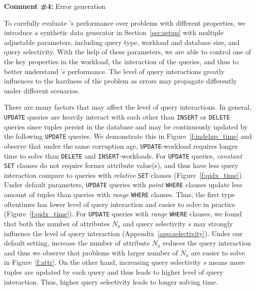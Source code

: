 \comskip

\noindent
\textbf{Comment \#4:} Error generation
\begin{quote}
\end{quote}


To carefully evaluate \sys's performance over problems with different
properties, we introduce a synthetic data generator in Section~\ref{sec:setup}
with multiple adjustable parameters, including query type, workload and
database size, and query selectivity. With the help of these parameters, we
are able to control one of the key properties in the workload, the interaction
of the queries, and thus to better understand \sys's performance. The level of
query interactions greatly influences to the hardness of the problem as errors
may propagate differently under different scenarios.

There are many factors that may affect the level of query interactions. In
general, \texttt{UPDATE} queries are heavily interact with each other than
\texttt{INSERT} or \texttt{DELETE} queries since tuples persist in the
database and may be continuously updated by the following \texttt{UPDATE}
queries. We demonstrate this in Figure~\ref{f:indelup_time} and observe that
under the same corruption age, \texttt{UPDATE}-workload requires longer time
to solve than \texttt{DELETE} and \texttt{INSERT}-workloads. For
\texttt{UPDATE} queries, \textit{constant} \texttt{SET} clauses do not require
former attribute value(s), and thus have less query interaction compare to
queries with \textit{relative} \texttt{SET} clauses
(Figure~\ref{f:qidx_time}). Under default parameters, \texttt{UPDATE} queries
with \textit{point} \texttt{WHERE} clauses update less amount of tuples than
queries with \textit{range} \texttt{WHERE} clauses. Thus, the first type
oftentimes has lower level of query interaction and easier to solve in
practice (Figure~\ref{f:qidx_time}). For \texttt{UPDATE} queries with
\textit{range} \texttt{WHERE} clauses, we found that both the number of
attributes $N_a$ and query selectivity $s$ may strongly influence the level of
query interaction (Appendix~\ref{app:selectivity}). Under our default setting,
increase the number of attribute $N_a$ reduces the query interaction and thus
we observe that problems with larger number of $N_a$ are easier to solve in
Figure~\ref{f:attr}. On the other hand, increasing query selectivity $s$ means
more tuples are updated by each query and thus leads to higher level of query
interaction. Thus, higher query selectivity leads to longer solving time.



